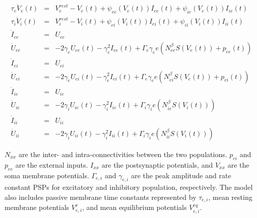 \documentclass[12pt,twoside]{article}
\begin{document}
\begin{eqnarray}
    \tau_{e}\dot{V}_{e}(t) &=& V_{e}^{rest} - V_{e}(t) + \psi_{ee}(V_{e}(t))I_{ee}(t) + \psi_{ie}(V_{e}(t))I_{ie}(t)\\
    \tau_{i}\dot{V}_{i}(t) &=& V_{i}^{rest} - V_{i}(t) + \psi_{ei}(V_{i}(t))I_{ei}(t) + \psi_{ii}(V_{i}(t))I_{ii}(t)\\
    \dot{I}_{ee} &=& U_{ee}\\
    \dot{U}_{ee} &=& -2\gamma_{e}U_{ee}(t) - \gamma_{e}^{2}I_{ee}(t) + \Gamma_{e}\gamma_{e}e(N_{ee}^{\beta}S(V_{e}(t)) + p_{ee}(t))\\
    \dot{I}_{ei} &=& U_{ei}\\
    \dot{U}_{ei} &=& -2\gamma_{e}U_{ei}(t) - \gamma_{e}^{2}I_{ei}(t) + \Gamma_{e}\gamma_{e}e(N_{ei}^{\beta}S(V_{e}(t)) + p_{ei}(t))\\
    \dot{I}_{ie} &=& U_{ie}\\
    \dot{U}_{ie} &=& -2\gamma_{i}U_{ie}(t) - \gamma_{i}^{2}I_{ie}(t) + \Gamma_{i}\gamma_{i}e(N_{ie}^{\beta}S(V_{i}(t)))\\
    \dot{I}_{ii} &=& U_{ii}\\
    \dot{U}_{ii} &=& -2\gamma_{i}U_{ii}(t) - \gamma_{i}^{2}I_{ii}(t) + \Gamma_{i}\gamma_{i}e(N_{ii}^{\beta}S(V_{i}(t)))
\end{eqnarray}

$N_{xx}$ are the inter- and intra-connectivities between the two populations. $p_{ei}$ and $p_{ee}$ are the external inputs. $I_{xx}$ are the postsynaptic potentials, and $V_{xx}$ are the soma membrane potentials. $\Gamma_{e,i}$ and $\gamma_{e,i}$ are the peak amplitude and rate constant PSPs for excitatory and inhibitory population, respectively. The model also includes passive membrane time constants represented by $\tau_{e,i}$, mean resting membrane potentials $V^{r}_{e,i}$, and mean equilibrium potentials $V^{eq}_{e,i}$.
\end{document}
